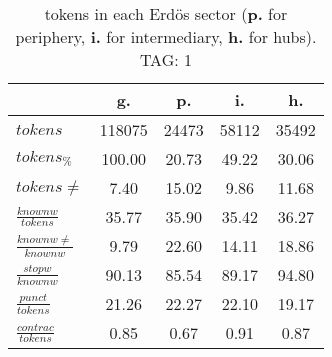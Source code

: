 \begin{table}[h!]
\begin{center}
\begin{tabular}{| l || c | c | c | c |}\hline
 & {\bf g.} & {\bf p.} & {\bf i.} & {\bf h.} \\\hline\hline
$tokens$ & 118075  & 24473  & 58112  & 35492 \\
$tokens_{\%}$ & 100.00  & 20.73  & 49.22  & 30.06 \\
$tokens \neq$ & 7.40  & 15.02  & 9.86  & 11.68 \\\hline
$\frac{knownw}{tokens}$ & 35.77  & 35.90  & 35.42  & 36.27 \\
$\frac{knownw \neq}{knownw}$ & 9.79  & 22.60  & 14.11  & 18.86 \\\hline
$\frac{stopw}{knownw}$ & 90.13  & 85.54  & 89.17  & 94.80 \\
$\frac{punct}{tokens}$ & 21.26  & 22.27  & 22.10  & 19.17 \\
$\frac{contrac}{tokens}$ & 0.85  & 0.67  & 0.91  & 0.87 \\\hline
\end{tabular}
\caption{tokens in each Erd\"os sector ({{\bf p.}} for periphery, {{\bf i.}} for intermediary, 
    {{\bf h.}} for hubs). TAG: 1}
\end{center}
\end{table}